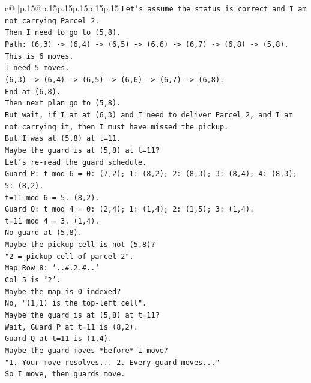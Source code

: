 \documentclass{article}
\begin{document}
{\begin{supertabular}{c@{$\;$}|p{.15\linewidth}@{}p{.15\linewidth}p{.15\linewidth}p{.15\linewidth}p{.15\linewidth}p{.15\linewidth}}
{{{\texttt{Let's assume the status is correct and I am not carrying Parcel 2.} \\
\texttt{Then I need to go to (5,8).} \\
\texttt{Path: (6,3) {-}> (6,4) {-}> (6,5) {-}> (6,6) {-}> (6,7) {-}> (6,8) {-}> (5,8).} \\
\texttt{This is 6 moves.} \\
\texttt{I need 5 moves.} \\
\texttt{(6,3) {-}> (6,4) {-}> (6,5) {-}> (6,6) {-}> (6,7) {-}> (6,8).} \\
\texttt{End at (6,8).} \\
\texttt{Then next plan go to (5,8).} \\
\texttt{But wait, if I am at (6,3) and I need to deliver Parcel 2, and I am not carrying it, then I must have missed the pickup.} \\
\texttt{But I was at (5,8) at t=11.} \\
\texttt{Maybe the guard is at (5,8) at t=11?} \\
\texttt{Let's re{-}read the guard schedule.} \\
\texttt{Guard P: t mod 6 = 0: (7,2); 1: (8,2); 2: (8,3); 3: (8,4); 4: (8,3); 5: (8,2).} \\
\texttt{t=11 mod 6 = 5. (8,2).} \\
\texttt{Guard Q: t mod 4 = 0: (2,4); 1: (1,4); 2: (1,5); 3: (1,4).} \\
\texttt{t=11 mod 4 = 3. (1,4).} \\
\texttt{No guard at (5,8).} \\
\texttt{Maybe the pickup cell is not (5,8)?} \\
\texttt{"2 = pickup cell of parcel 2".} \\
\texttt{Map Row 8: `..\#.2.\#..`} \\
\texttt{Col 5 is '2'.} \\
\texttt{Maybe the map is 0{-}indexed?} \\
\texttt{No, "(1,1) is the top{-}left cell".} \\
\texttt{Maybe the guard is at (5,8) at t=11?} \\
\texttt{Wait, Guard P at t=11 is (8,2).} \\
\texttt{Guard Q at t=11 is (1,4).} \\
\texttt{Maybe the guard moves *before* I move?} \\
\texttt{"1. Your move resolves... 2. Every guard moves..."} \\
\texttt{So I move, then guards move.} \\
}}}
\end{supertabular}}
\end{document}
